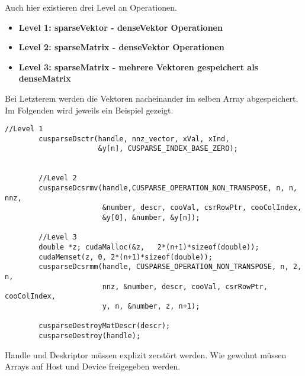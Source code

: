 		Auch hier existieren drei Level an Operationen.
		\begin{itemize}
			\item \textbf{Level 1: sparseVektor - denseVektor Operationen}\\
			\item \textbf{Level 2: sparseMatrix - denseVektor Operationen}\\
			\item \textbf{Level 3: sparseMatrix - mehrere Vektoren gespeichert als denseMatrix}
		\end{itemize}
		
		Bei Letzterem werden die Vektoren nacheinander im selben Array abgespeichert. Im Folgenden wird jeweils ein Beispiel gezeigt. 
		\begin{lstlisting}[caption=cuSPARSE: Beispiele und Cleanup]
		//Level 1
		cusparseDsctr(handle, nnz_vector, xVal, xInd, 
		              &y[n], CUSPARSE_INDEX_BASE_ZERO);


		//Level 2
		cusparseDcsrmv(handle,CUSPARSE_OPERATION_NON_TRANSPOSE, n, n, nnz,
		               &number, descr, cooVal, csrRowPtr, cooColIndex, 
		               &y[0], &number, &y[n]);

		//Level 3
		double *z; cudaMalloc(&z,   2*(n+1)*sizeof(double));
		cudaMemset(z, 0, 2*(n+1)*sizeof(double));
		cusparseDcsrmm(handle, CUSPARSE_OPERATION_NON_TRANSPOSE, n, 2, n,
		               nnz, &number, descr, cooVal, csrRowPtr, cooColIndex, 
		               y, n, &number, z, n+1);
               
		cusparseDestroyMatDescr(descr);
		cusparseDestroy(handle);
		\end{lstlisting}

		\Gls{Handle} und Deskriptor müssen explizit zerstört werden. Wie gewohnt müssen Arrays auf Host und Device freigegeben werden.

